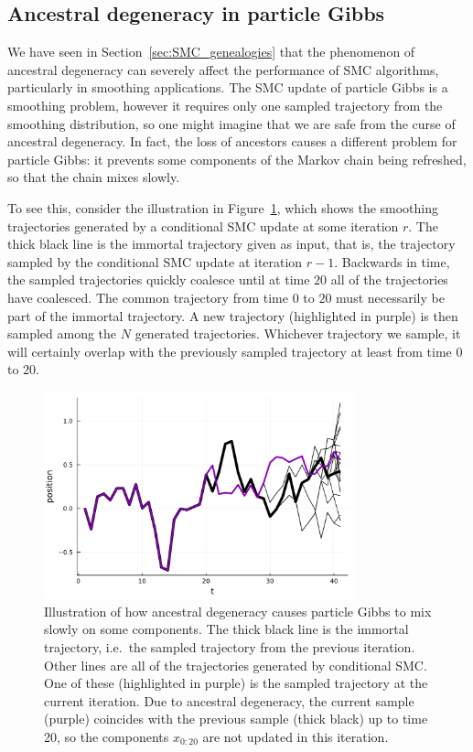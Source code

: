 \subsection{Ancestral degeneracy in particle Gibbs}
We have seen in Section~\ref{sec:SMC_genealogies} that the phenomenon of ancestral degeneracy can severely affect the performance of SMC algorithms, particularly in smoothing applications.
The SMC update of particle Gibbs is a smoothing problem, however it requires only one sampled trajectory from the smoothing distribution, so one might imagine that we are safe from the curse of ancestral degeneracy.
In fact, the loss of ancestors causes a different problem for particle Gibbs: it prevents some components of the Markov chain being refreshed, so that the chain mixes slowly.

To see this, consider the illustration in Figure~\ref{fig:PG_ancdegen}, which shows the smoothing trajectories generated by a conditional SMC update at some iteration $r$. The thick black line is the immortal trajectory given as input, that is, the trajectory sampled by the conditional SMC update at iteration $r-1$. Backwards in time, the sampled trajectories quickly coalesce until at time $20$ all of the trajectories have coalesced. The common trajectory from time $0$ to $20$ must necessarily be part of the immortal trajectory.
A new trajectory (highlighted in purple) is then sampled among the $N$ generated trajectories. Whichever trajectory we sample, it will certainly overlap with the previously sampled trajectory at least from time $0$ to $20$.

\begin{figure}[ht]
\centering
\includegraphics[width=0.8\textwidth]{plots/PG_degen.pdf}
\caption[Ancestral degeneracy in particle Gibbs]{Illustration of how ancestral degeneracy causes particle Gibbs to mix slowly on some components. The thick black line is the immortal trajectory, i.e.\ the sampled trajectory from the previous iteration. Other lines are all of the trajectories generated by conditional SMC. One of these (highlighted in purple) is the sampled trajectory at the current iteration. Due to ancestral degeneracy, the current sample (purple) coincides with the previous sample (thick black) up to time 20, so the components $x_{0:20}$ are not updated in this iteration.}
\label{fig:PG_ancdegen}
\end{figure}

